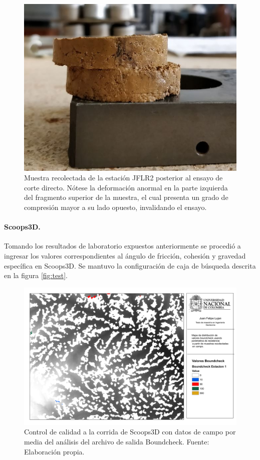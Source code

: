 \begin{figure}[H]
\centering
\includegraphics[scale=1]{img/est2.jpg}
\caption{Muestra recolectada de la estaci\'on JFLR2 posterior al ensayo de corte directo. N\'otese la deformaci\'on anormal en la parte izquierda del fragmento superior de la muestra, el cual presenta un grado de compresi\'on mayor a su lado opuesto, invalidando el ensayo.}
\label{fig:toma-bloque}
\end{figure}


\paragraph{Scoops3D.}
Tomando los resultados de laboratorio expuestos anteriormente se procedi\'o a ingresar los valores correspondientes al \'angulo de fricci\'on, cohesi\'on y gravedad espec\'ifica en Scoops3D. Se mantuvo la configuraci\'on de caja de b\'usqueda descrita en la figura \ref{fig:test}.

\begin{figure}[H]
\centering
\includegraphics[scale=0.3]{img/boundcheckCampo.pdf}
\caption{Control de calidad a la corrida de Scoops3D con datos de campo por media del an\'alisis del archivo de salida Boundcheck. Fuente: Elaboraci\'on propia.}
\label{fig:dem usado}
\end{figure}

